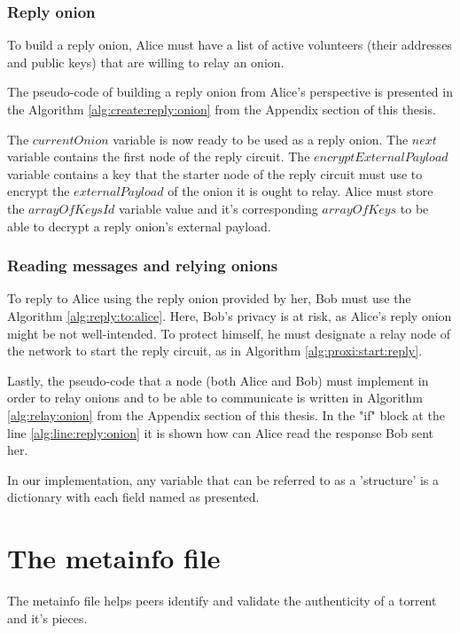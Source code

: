

\subsubsection*{Reply onion}

To build a reply onion, Alice must have a list of active volunteers (their addresses and public keys) that are willing to relay an onion.

The pseudo-code of building a reply onion from Alice's perspective is presented in the Algorithm \ref{alg:create:reply:onion} from the Appendix section of this thesis.

The $ currentOnion $ variable is now ready to be used as a reply onion. The $ next $ variable contains the first node of the reply circuit. The $ encryptExternalPayload $ variable contains a key that the starter node of the reply circuit must use to encrypt the $ externalPayload $ of the onion it is ought to relay. {Alice must store the $ arrayOfKeysId $ variable value and it's corresponding $ arrayOfKeys $ to be able to decrypt a reply onion's external payload.} 

\subsubsection*{Reading messages and relying onions}

To reply to Alice using the reply onion provided by her, Bob must use the Algorithm \ref{alg:reply:to:alice}. Here, Bob's privacy is at risk, as Alice's reply onion might be not well-intended. To protect himself, he must designate a relay node of the network to start the reply circuit, as in Algorithm \ref{alg:proxi:start:reply}.

Lastly, the pseudo-code that a node (both Alice and Bob) must implement in order to relay onions and to be able to communicate is written in Algorithm \ref{alg:relay:onion} from the Appendix section of this thesis. In the "if" block at the line \ref{alg:line:reply:onion} it is shown how can Alice read the response Bob sent her.

In our implementation, any variable that can be referred to as a 'structure' is a dictionary with each field named as presented. \label{algs:use:JSONs:implementation}

\section{The metainfo file}
The metainfo file helps peers identify and validate the authenticity of a torrent and it's pieces.

